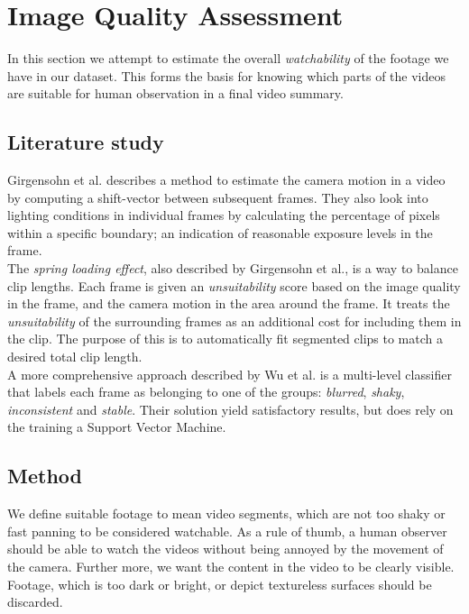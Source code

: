 %
\chapter{Image Quality Assessment}\label{chp:image_qual_ass}
%
In this section we attempt to estimate the overall \textit{watchability} of the footage we have in our dataset. This forms the basis for knowing which parts of the videos are suitable for human observation in a final video summary.
%
\section{Literature study}
%
Girgensohn et al.\cite{Girgensohn:2000:SAH:354401.354415} describes a method to estimate the camera motion in a video by computing a shift-vector between subsequent frames. They also look into lighting conditions in individual frames by calculating the percentage of pixels within a specific boundary; an indication of reasonable exposure levels in the frame.\\
The \textit{spring loading effect}\cite{Girgensohn:2000:SAH:354401.354415}, also described by Girgensohn et al., is a way to balance clip lengths. Each frame is given an \textit{unsuitability} score based on the image quality in the frame, and the camera motion in the area around the frame. It treats the \textit{unsuitability} of the surrounding frames as an additional cost for including them in the clip. The purpose of this is to automatically fit segmented clips to match a desired total clip length.\\
A more comprehensive approach described by Wu et al.\cite{10.1109/ICME.2005.1521399} is a multi-level classifier that labels each frame as belonging to one of the groups: \textit{blurred}, \textit{shaky}, \textit{inconsistent} and \textit{stable}. Their solution yield satisfactory results, but does rely on the training a Support Vector Machine.
%
\section{Method}
%
We define suitable footage to mean video segments, which are not too shaky or fast panning to be considered watchable. As a rule of thumb, a human observer should be able to watch the videos without being annoyed by the movement of the camera. Further more, we want the content in the video to be clearly visible. Footage, which is too dark or bright, or depict textureless surfaces should be discarded.
%
